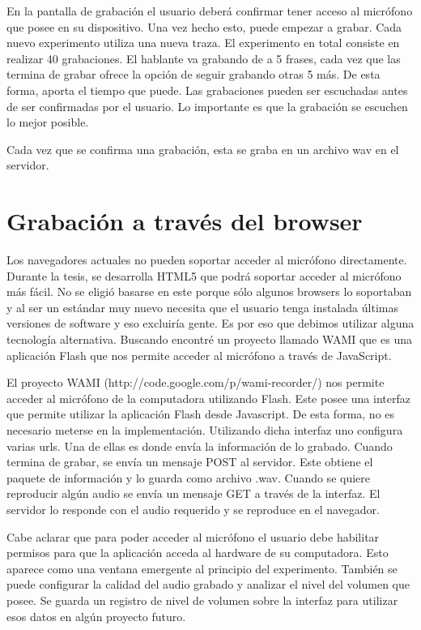 \documentclass[11pt,a4paper,twoside]{tesis}
\begin{document}
En la pantalla de grabación el usuario deberá confirmar tener acceso al micrófono que posee en su dispositivo. Una vez hecho esto, puede empezar a grabar. Cada nuevo experimento utiliza una nueva traza. El experimento en total consiste en realizar 40 grabaciones. El hablante va grabando de a 5 frases, cada vez que las termina de grabar ofrece la opción de seguir grabando otras 5 más. De esta forma, aporta el tiempo que puede. Las grabaciones pueden ser escuchadas antes de ser confirmadas por el usuario. Lo importante es que la grabación se escuchen lo mejor posible.

Cada vez que se confirma una grabación, esta se graba en un archivo wav en el servidor. 


\section{Grabación a través del browser}

Los navegadores actuales no pueden soportar acceder al micrófono directamente. Durante la tesis, se desarrolla HTML5 que podrá soportar acceder al micrófono más fácil. No se eligió basarse en este porque sólo algunos browsers lo soportaban y al ser un estándar muy nuevo necesita que el usuario tenga instalada últimas versiones de software y eso excluiría gente. Es por eso que debimos utilizar alguna tecnología alternativa. Buscando encontré un proyecto llamado WAMI que es una aplicación Flash que nos permite acceder al micrófono a través de JavaScript. 

El proyecto WAMI (http://code.google.com/p/wami-recorder/) nos permite acceder al micrófono de la computadora utilizando Flash. Este posee una interfaz que permite utilizar la aplicación Flash desde Javascript. De esta forma, no es necesario meterse en la implementación. Utilizando dicha interfaz uno configura varias urls. Una de ellas es donde envía la información de lo grabado. Cuando termina de grabar, se envía un mensaje POST al servidor. Este obtiene el paquete de información y lo guarda como archivo .wav. Cuando se quiere reproducir algún audio se envía un mensaje GET a través de la interfaz. El servidor lo responde con el audio requerido y se reproduce en el navegador. 

Cabe aclarar que para poder acceder al micrófono el usuario debe habilitar permisos para que la aplicación acceda al hardware de su computadora. Esto aparece como una ventana emergente al principio del experimento. También se puede configurar la calidad del audio grabado y analizar el nivel del volumen que posee. Se guarda un registro de nivel de volumen sobre la interfaz para utilizar esos datos en algún proyecto futuro.
\end{document}
